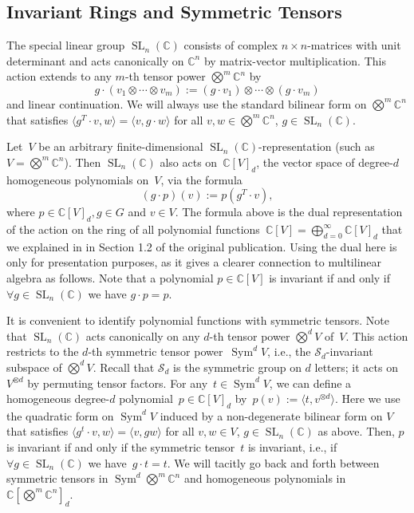 \documentclass[10pt,a4paper]{article}
\newcommand{\C}{\mathbb C}
\newcommand{\SL}{\operatorname{SL}}
\newcommand{\Sym}{\operatorname{Sym}}
\newcommand{\tensor}{\textstyle\bigotimes}
\begin{document}
\subsection{Invariant Rings and Symmetric Tensors}\label{sec:invariants}
%
The special linear group $\SL_n(\C)$ consists of complex $n\times n$-matrices with unit determinant and acts canonically on $\C^n$ by matrix-vector multiplication.
This action extends to any $m$-th tensor power $\tensor^m \C^n$ by
\begin{equation}\label{eq:SL on tensor power}
g \cdot (v_1 \otimes \cdots \otimes v_m) := (g \cdot v_1) \otimes \cdots \otimes (g \cdot v_m)
\end{equation}
and linear continuation.
We will always use the standard bilinear form on $\tensor^m \C^n$ that satisfies $\langle g^T \cdot v, w\rangle = \langle v, g \cdot w \rangle$ for all $v,w \in \tensor^m\C^n$, $g \in \SL_n(\C)$.
%

Let~$V$ be an arbitrary finite-dimensional $\SL_n(\C)$-representation (such as $V = \tensor^m\C^n$).
Then $\SL_n(\C)$ also acts on~$\C[V]_d$, the vector space of degree-$d$ homogeneous polynomials on~$V$, via the formula
\[
(g \cdot p)(v) := p(g^T \cdot v),
\]
where $p \in \C[V]_d, g \in G$ and $v \in V$.
The formula above is the dual representation of the action on the ring of all polynomial functions~$\C[V] = \bigoplus_{d=0}^\infty \C[V]_d$ that we explained in in Section 1.2 of the original publication.
Using the dual here is only for presentation purposes, as it gives a clearer connection to multilinear algebra as follows.
%
Note that a polynomial $p \in \C[V]$ is invariant if and only if $\forall g \in \SL_n(\C)$ we have $g \cdot p=p$.
%
%

It is convenient to identify polynomial functions with symmetric tensors.
Note that $\SL_n(\C)$ acts canonically on any $d$-th tensor power $\tensor^d V$ of~$V$.
This action restricts to the $d$-th symmetric tensor power~$\Sym^d V$, i.e., the $\mathcal{S}_d$-invariant subspace of $\tensor^d V$. Recall that $\mathcal{S}_d$ is the symmetric group on $d$ letters; it acts on $V^{\otimes d}$ by permuting tensor factors.
For any~$t \in \Sym^d V$, we can define a homogeneous degree-$d$ polynomial~$p\in\C[V]_d$ by~$p(v) := \langle t, v^{\otimes d}\rangle$.
Here we use the quadratic form on $\Sym^d V$ induced by a non-degenerate bilinear form on $V$ that satisfies $\langle g^t\cdot v, w\rangle = \langle v,g w\rangle$ for all $v,w \in V$, $g \in \SL_n(\C)$ as above.
Then, $p$ is invariant if and only if the symmetric tensor~$t$ is invariant, i.e., if $\forall g \in \SL_n(\C)$ we have~$g \cdot t=t$.
We will tacitly go back and forth between symmetric tensors in $\Sym^d \tensor^m \C^n$ and homogeneous polynomials in~$\C[\tensor^m \C^n]_d$.
\end{document}
